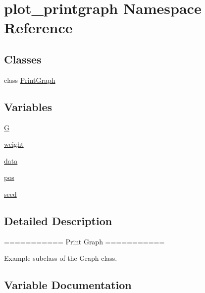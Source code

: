 \hypertarget{namespaceplot__printgraph}{}\section{plot\+\_\+printgraph Namespace Reference}
\label{namespaceplot__printgraph}
\subsection*{Classes}
\begin{DoxyCompactItemize}
\item 
class \hyperlink{classplot__printgraph_1_1PrintGraph}{Print\+Graph}
\end{DoxyCompactItemize}
\subsection*{Variables}
\begin{DoxyCompactItemize}
\item 
\hyperlink{namespaceplot__printgraph_a2c19c7a9c66b44f59d5946c8babcfe0a}{G}
\item 
\hyperlink{namespaceplot__printgraph_a78d8fbaa62eda376e90a38f03e689417}{weight}
\item 
\hyperlink{namespaceplot__printgraph_aa2569a7aae75b982ab179192f0bd9102}{data}
\item 
\hyperlink{namespaceplot__printgraph_afbe75fe5e380461e72684b47a5d4a355}{pos}
\item 
\hyperlink{namespaceplot__printgraph_a98fc6a684a242686803cfaa3d5d6d0bf}{seed}
\end{DoxyCompactItemize}


\subsection{Detailed Description}
\begin{DoxyVerb}===========
Print Graph
===========

Example subclass of the Graph class.
\end{DoxyVerb}
 

\subsection{Variable Documentation}
\mbox{\label{namespaceplot__printgraph_aa2569a7aae75b982ab179192f0bd9102}} 

